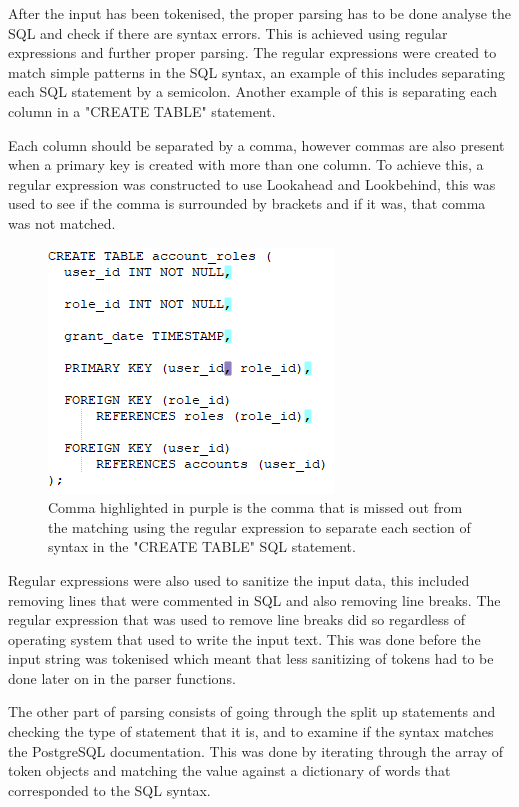 After the input has been tokenised, the proper parsing has to be done analyse the SQL and check if there are syntax errors. This is achieved using regular expressions and further proper parsing. The regular expressions were created to match simple patterns in the SQL syntax, an example of this includes separating each SQL statement by a semicolon. Another example of this is separating each column in a "CREATE TABLE" statement. 

Each column should be separated by a comma, however commas are also present when a primary key is created with more than one column. To achieve this, a regular expression was constructed to use Lookahead and Lookbehind, this was used to see if the comma is surrounded by brackets and if it was, that comma was not matched.

\begin{figure}[h!]
	\centering
	\includegraphics{regex}
	\caption{Comma highlighted in purple is the comma that is missed out from the matching using the regular expression to separate each section of syntax in the "CREATE TABLE" SQL statement.}
	\label{fig:regex}
\end{figure}

Regular expressions were also used to sanitize the input data, this included removing lines that were commented in SQL and also removing line breaks. The regular expression that was used to remove line breaks did so regardless of operating system that used to write the input text. This was done before the input string was tokenised which meant that less sanitizing of tokens had to be done later on in the parser functions.

The other part of parsing consists of going through the split up statements and checking the type of statement that it is, and to examine if the syntax matches the PostgreSQL documentation.  This was done by iterating through the array of token objects and matching the value against a dictionary of words that corresponded to the SQL syntax. 

